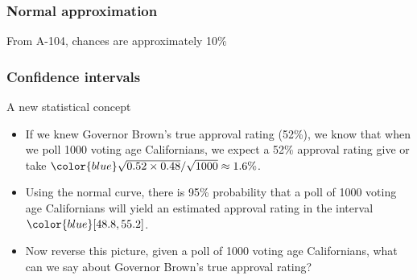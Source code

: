 \documentclass[handout]{beamer}
\begin{document}
   \begin{frame}
   \frametitle{Normal approximation}
   \begin{center}
   \end{center}
   From A-104, chances are approximately 10\%
   \end{frame}


   \begin{frame} \frametitle{Confidence intervals}

   \begin{block}
   {A new statistical concept}
   \begin{itemize}
   \item If we knew Governor Brown's true approval rating (52\%), we know that
   when we poll 1000 voting age Californians, we expect a 52\% approval rating
   give or take ${\color{blue} \sqrt{0.52 \times 0.48} /  \sqrt{1000} \approx 1.6\%}$.

   \item Using the normal curve, there is 95\% probability that a poll of
   1000 voting age Californians
   will yield an estimated approval rating in the interval ${\color{blue} [48.8,55.2]}$.

   \item Now reverse this picture, given a poll of 1000 voting age Californians,   what can we say about Governor Brown's true approval rating?
   \end{itemize}
   \end{block}
   \end{frame}

\end{document}
